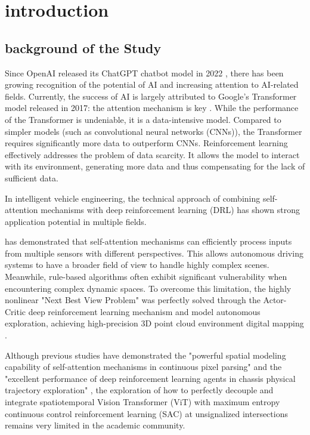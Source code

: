 
\section{introduction}
    \subsection{background of the Study}
    Since OpenAI released its ChatGPT chatbot model in 2022 \cite{noauthor_introducing_2022}, there has been growing recognition of the potential of AI and increasing attention to AI-related fields. Currently, the success of AI is largely attributed to Google's Transformer model released in 2017: the attention mechanism is key \cite{vaswani_attention_2023}. While the performance of the Transformer is undeniable, it is a data-intensive model. Compared to simpler models (such as convolutional neural networks (CNNs)), the Transformer requires significantly more data to outperform CNNs. Reinforcement learning effectively addresses the problem of data scarcity. It allows the model to interact with its environment, generating more data and thus compensating for the lack of sufficient data.

    In intelligent vehicle engineering, the technical approach of combining self-attention mechanisms with deep reinforcement learning (DRL) has shown strong application potential in multiple fields.

    \cite{huang_research_2025} has demonstrated that self-attention mechanisms can efficiently process inputs from multiple sensors with different perspectives. This allows autonomous driving systems to have a broader field of view to handle highly complex scenes. Meanwhile, rule-based algorithms often exhibit significant vulnerability when encountering complex dynamic spaces. To overcome this limitation, the highly nonlinear "Next Best View Problem" was perfectly solved through the Actor-Critic deep reinforcement learning mechanism and model autonomous exploration, achieving high-precision 3D point cloud environment digital mapping \cite{menglong_yang_automatic_2019}.

    Although previous studies have demonstrated the "powerful spatial modeling capability of self-attention mechanisms in continuous pixel parsing" \cite{huang_research_2025} and the "excellent performance of deep reinforcement learning agents in chassis physical trajectory exploration" \cite{menglong_yang_automatic_2019}, the exploration of how to perfectly decouple and integrate spatiotemporal Vision Transformer (ViT) with maximum entropy continuous control reinforcement learning (SAC) at unsignalized intersections remains very limited in the academic community.

